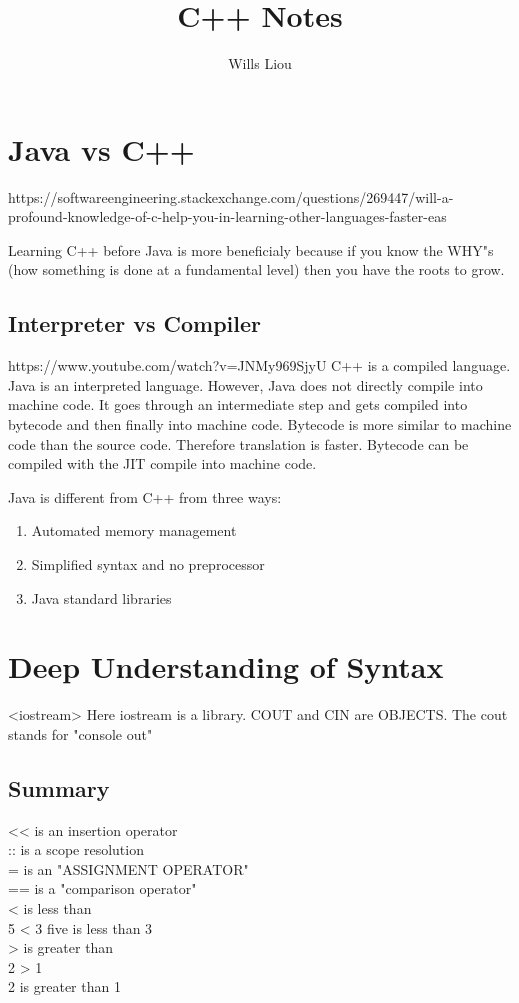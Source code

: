 \documentclass[a4paper,12pt]{book}
\title{C++ Notes}
\author{Wills Liou}
\begin{document}
	\tableofcontents


\chapter{Java vs C++}
https://softwareengineering.stackexchange.com/questions/269447/will-a-profound-knowledge-of-c-help-you-in-learning-other-languages-faster-eas

Learning C++ before Java is more beneficialy because if you know the WHY"s (how something is done at a fundamental level) then you have the roots to grow. 


\section{Interpreter vs Compiler}
https://www.youtube.com/watch?v=JNMy969SjyU
C++ is a compiled language. Java is an interpreted language. However, Java does not directly compile into machine code. It goes through an intermediate step and gets compiled into bytecode and then finally into machine code. Bytecode is more similar to machine code than the source code. Therefore translation is faster. Bytecode can be compiled with the JIT compile into machine code.


Java is different from C++ from three ways:
\begin{enumerate}
	\item Automated memory management
	\item Simplified syntax and no preprocessor
	\item Java standard libraries
\end{enumerate}

\chapter{Deep Understanding of Syntax}
<iostream>
	Here iostream is a library.	COUT and CIN are OBJECTS. The cout stands for "console out"
		
	
\section{Summary}
	<< is an insertion operator \\
	:: is a scope resolution \\ 
	= is an "ASSIGNMENT OPERATOR" \\
	== is a "comparison operator" \\
	< is less than \\
	5 < 3    five is less than 3 \\
	> is greater than \\ 
	2 > 1 \\
	2 is greater than 1 \\ 
\end{document}
